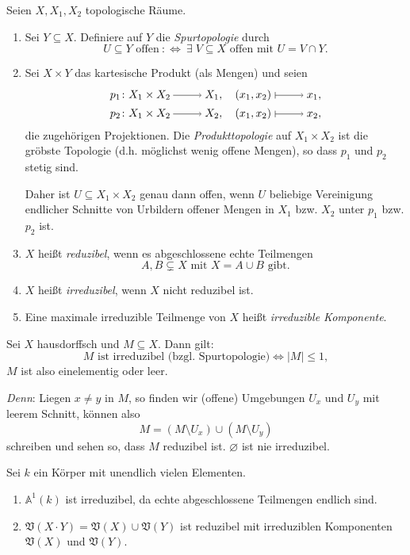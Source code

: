 \documentclass[a4paper,12pt,index=toc]{scrbook}
\theoremstyle{keinenummern} %
\def\A{\mathbb{A}}
\def\V{\mathfrak{V}}
\newcommand{\leer}{\ensuremath{\varnothing}}
\newcommand{\card}[1]{|#1|}
\begin{document}
\begin{de}\label{1.2.6} Seien $X,X_{1},X_{2}$ topologische Räume.
\begin{enumerate}
\item Sei $Y\subseteq X$. Definiere auf $Y$ die \emph{Spurtopologie} durch
\[U\subseteq Y\text{ offen}\: :\Longleftrightarrow\:\exists\;V\subseteq X\text{ offen mit }U=V\cap Y.\]
\item Sei $X\times Y$ das kartesische Produkt (als Mengen) und seien
\begin{align*}p_{1}\colon X_{1}\times X_{2}\ra X_{1},\quad(x_{1},x_{2})\mapsto x_{1},\\p_{2}\colon X_{1}\times X_{2}\ra X_{2},\quad(x_{1},x_{2})\mapsto x_{2},\end{align*}
die zugehörigen Projektionen. Die \emph{Produkttopologie} auf $X_{1}\times X_{2}$ ist die gröbste Topologie (d.h. möglichst wenig offene Mengen), so dass $p_{1}$ und $p_{2}$ stetig sind.

Daher ist $U\subseteq X_{1}\times X_{2}$ genau dann offen, wenn $U$ beliebige Vereinigung endlicher Schnitte von Urbildern offener Mengen in $X_{1}$ bzw. $X_{2}$ unter $p_{1}$ bzw. $p_{2}$ ist.

\item $X$ heißt \emph{reduzibel}, wenn es abgeschlossene echte Teilmengen \[A,B\subsetneq X\text{ mit }X=A\cup B\text{ gibt.}\]

\item $X$ heißt \emph{irreduzibel}, wenn $X$ nicht reduzibel ist.

\item Eine maximale irreduzible Teilmenge von $X$ heißt \emph{irreduzible Komponente}.
\end{enumerate}\end{de}

\begin{bsp}\label{1.2.7}
Sei $X$ hausdorffsch und $M\subseteq X$. Dann gilt:
\[M\text{ ist irreduzibel (bzgl. Spurtopologie)}\iff \card{M}\leq 1,\]
$M$ ist also einelementig oder leer.

\textit{Denn}: Liegen $x\neq y$ in $M$, so finden wir (offene) Umgebungen $U_{x}$ und $U_{y}$ mit leerem Schnitt, können also
\[M=(M\setminus U_{x})\cup(M\setminus U_{y})\]
schreiben und sehen so, dass $M$ reduzibel ist. $\leer$ ist nie irreduzibel.
\end{bsp}

\begin{bsp}\label{1.2.8} Sei $k$ ein Körper mit unendlich vielen Elementen.
\begin{enumerate}
\item{} $\A^{1}(k)$ ist irreduzibel, da echte abgeschlossene Teilmengen endlich sind.
\item\label{1.2.8b} $\V(X\cdot Y) = \V(X)\cup\V(Y)$ ist reduzibel mit irreduziblen Komponenten $\V(X)$ und $\V(Y)$.
\end{enumerate}\end{bsp}
\end{document}
